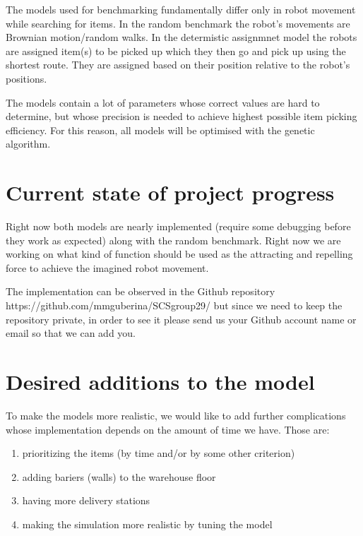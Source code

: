 \documentclass{article}
\begin{document}
The models used for benchmarking fundamentally differ only in robot movement
while searching for items. In the random benchmark the robot's movements
are Brownian motion/random walks. In the determistic assignmnet model
the robots are assigned item(s) to be picked up which they then go and pick up
using the shortest route. They are assigned based on their 
position relative to the robot's positions.

The models contain a lot of parameters whose correct values are hard to determine,
but whose precision is needed to achieve highest possible item picking efficiency.
For this reason, all models will be optimised with the genetic algorithm.

\section{Current state of project progress}
Right now both models are nearly implemented (require some debugging before
they work as expected) along with the random benchmark. 
Right now we are working on what kind of function should be used
as the attracting and repelling force to achieve the imagined robot movement.

The implementation can be observed in the Github repository 
\newline
https://github.com/mmguberina/SCSgroup29/
\newline
but since we need to keep the repository private, in order to see it please 
send us your Github account name or email so that we can add you.

\section{Desired additions to the model}
To make the models more realistic, we would like to add further complications
whose implementation depends on the amount of time we have.
Those are:

\begin{enumerate}
		\item prioritizing the items (by time and/or by some other criterion)
		\item adding bariers (walls) to the warehouse floor
		\item having more delivery stations
		\item making the simulation more realistic by tuning the model
\end{enumerate}
\end{document}
